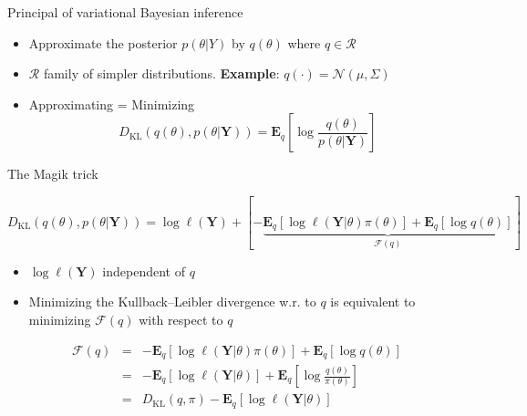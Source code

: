 \documentclass[compress,10pt]{beamer}
\begin{document}
\begin{frame}{Principal of variational Bayesian inference}
\protect\hypertarget{variational-bayesian-inference}{}
\begin{itemize}
\item
  Approximate the posterior \(p(\theta | Y)\) by \(q(\theta)\) where
  \(q\in \mathcal{R}\)
\item
  \(\mathcal{R}\) family of simpler distributions. \textbf{Example}:
  \(q(\cdot) = \mathcal{N}(\mu,\Sigma)\)
\item
  Approximating = Minimizing
  \[ D_\text{KL}(q(\theta),p(\theta | \mathbf{Y})) = \mathbf{E}_q\left[\log \frac{q(\theta)}{p(\theta | \mathbf{Y})}\right]\]
\end{itemize}
\end{frame}
\begin{frame}{The Magik trick}



$$D_\text{KL}(q(\theta),p(\theta | \mathbf{Y}))  = \log \ell(\mathbf{Y}) + \left[ - \underbrace{\mathbf{E}_q[\log \ell(\mathbf{Y}|\theta)\pi(\theta)] +\mathbf{E}_q[\log q(\theta)]}_{\mathcal{F}(q)}\right]$$ 

\begin{itemize}
 \item \(\log \ell(\mathbf{Y})\) independent of \(q\)
\item   Minimizing the Kullback–Leibler divergence  w.r. to $q$ is
equivalent to minimizing $\mathcal{F}(q)$ with respect to $q$

\end{itemize}


\begin{eqnarray}
\mathcal{F}(q) &=& -  \mathbf{E}_q[\log \ell(\mathbf{Y}|\theta)\pi(\theta)] + \mathbf{E}_q[\log q(\theta)] \\
&=&  -  \mathbf{E}_q[\log \ell(\mathbf{Y}|\theta)] + \mathbf{E}_q\left[\log \frac{q(\theta)}{\pi(\theta)}\right] \\
&=&D_{\text{KL}}(q,\pi) -  \mathbf{E}_q[\log \ell(\mathbf{Y}|\theta)]   
\end{eqnarray}

\end{frame}
\end{document}
